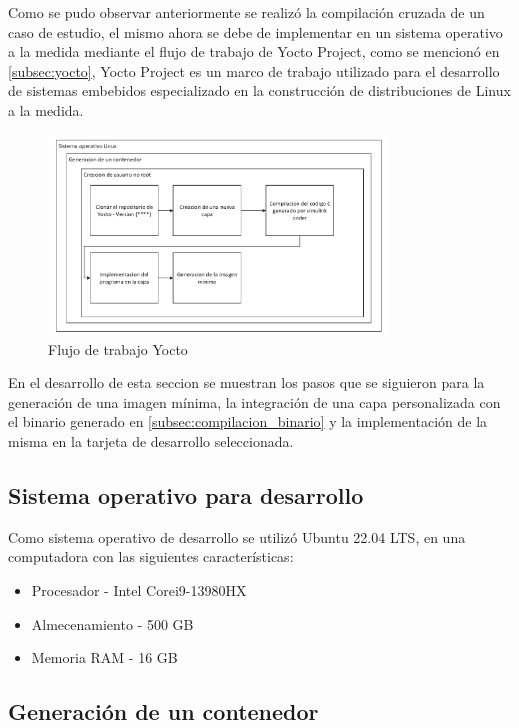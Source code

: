 Como se pudo observar anteriormente se realizó la compilación cruzada de un caso de estudio, el mismo ahora se debe de implementar en un sistema operativo a la medida mediante el flujo de trabajo de Yocto Project, como se mencionó en \ref{subsec:yocto}, Yocto Project es un marco de trabajo utilizado para el desarrollo de sistemas embebidos especializado en la construcción de distribuciones de Linux a la medida. 

\begin{figure}[h!]
    \centering
    \includegraphics[width=0.8\textwidth]{fig/especifico_2/Flujo de trabajo de mi idea.pdf}
    \caption{Flujo de trabajo Yocto}
    \label{fig:flujo_yocto}
\end{figure}

En el desarrollo de esta seccion se muestran los pasos que se siguieron para la generación de una imagen mínima, la integración de una capa personalizada con el binario generado en \ref{subsec:compilacion_binario} y la implementación de la misma en la tarjeta de desarrollo seleccionada.

\subsection{Sistema operativo para desarrollo}

Como sistema operativo de desarrollo se utilizó Ubuntu 22.04 LTS, en una computadora con las siguientes características:

\begin{itemize}
    \item Procesador - Intel Corei9-13980HX 
    \item Almecenamiento - 500 GB
    \item Memoria RAM - 16 GB 
\end{itemize}

\subsection{Generación de un contenedor}

